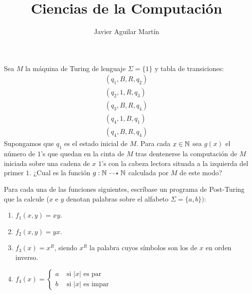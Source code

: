 \documentclass[twoside]{article}
\begin{document}
\title{Ciencias de la Computación}

\author{Javier Aguilar Martín}
\maketitle

\begin{ejercicio}{1}
Sea $M$ la máquina de Turing de lenguaje $Σ = \{1\}$ y tabla de transiciones:
\begin{align*}
	(q_1,B,R,q_2)\\
	(q_2,1,R,q_3)\\
	(q_3,B,R,q_4)\\
	(q_4,1,B,q_1)\\
	(q_4,B,R,q_4)
\end{align*}
Supongamos que $q_1$ es el estado inicial de $M$. Para cada $x \in \mathbb{N}$ sea $g(x)$ el número de $1$'s que quedan en la cinta de $M$ tras dentenerse la computación de $M$ iniciada sobre una cadena de $x$ $1$'s con la cabeza lectora situada a la izquierda del primer $1$. ¿Cual es la función $g : \mathbb{N} \dashrightarrow \mathbb{N}$ calculada por $M$ de este modo?
\end{ejercicio}

\begin{ejercicio}{2}
Para cada una de las funciones siguientes, escríbase un programa de Post-Turing que la calcule ($x$ e $y$ denotan palabras sobre el alfabeto $Σ = \{a,b\})$:
\begin{enumerate}
	\item $f_1(x,y)=xy$.
	\item $f_2(x,y)=yx$.
	\item $f_3(x) = x^R$, siendo $x^R$ la palabra cuyos símbolos son los de $x$ en orden inverso.
	\item $f_4(x) = \begin{cases}
		a &\text{ si }|x|\text{ es par}\\
		b &\text{ si }|x|\text{ es impar}
	\end{cases}$
\end{enumerate}
\end{ejercicio}
\end{document}
